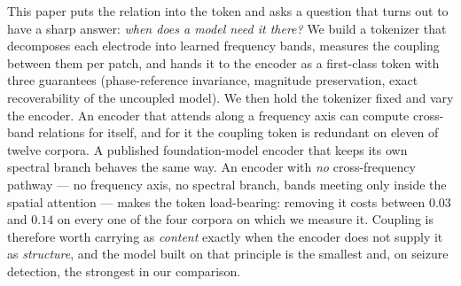 This paper puts the relation into the token and asks a question that turns
out to have a sharp answer: \emph{when does a model need it there?} We
build a tokenizer that decomposes each electrode into learned frequency
bands, measures the coupling between them per patch, and hands it to the
encoder as a first-class token with three guarantees (phase-reference
invariance, magnitude preservation, exact recoverability of the uncoupled
model). We then hold the tokenizer fixed and vary the encoder. An encoder
that attends along a frequency axis can compute cross-band relations for
itself, and for it the coupling token is redundant on eleven of twelve
corpora. A published foundation-model encoder that keeps its own spectral
branch behaves the same way. An encoder with \emph{no} cross-frequency
pathway --- no frequency axis, no spectral branch, bands meeting only
inside the spatial attention --- makes the token load-bearing: removing it
costs between $0.03$ and $0.14$ on every one of the four corpora on which
we measure it. Coupling is therefore worth carrying as \emph{content}
exactly when the encoder does not supply it as \emph{structure}, and the
model built on that principle is the smallest and, on seizure detection,
the strongest in our comparison.

